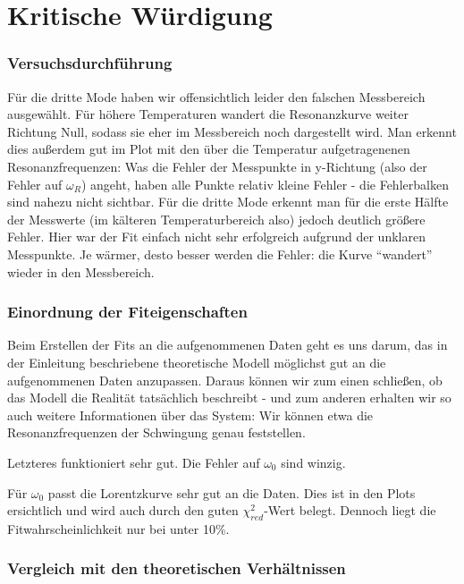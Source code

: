 \section{Kritische Würdigung}

\subsubsection*{Versuchsdurchführung}


Für die dritte Mode haben wir offensichtlich leider den falschen Messbereich ausgewählt.
Für höhere Temperaturen wandert die Resonanzkurve weiter Richtung Null, sodass sie eher im Messbereich noch dargestellt wird.
Man erkennt dies außerdem gut im Plot mit den über die Temperatur aufgetragenenen Resonanzfrequenzen:
Was die Fehler der Messpunkte in y-Richtung (also der Fehler auf $\omega_R$) angeht, haben alle Punkte relativ kleine Fehler - die Fehlerbalken sind nahezu nicht sichtbar.
Für die dritte Mode erkennt man für die erste Hälfte der Messwerte (im kälteren Temperaturbereich also) jedoch deutlich größere Fehler.
Hier war der Fit einfach nicht sehr erfolgreich aufgrund der unklaren Messpunkte.
Je wärmer, desto besser werden die Fehler: die Kurve \enquote{wandert} wieder in den Messbereich.

\subsubsection*{Einordnung der Fiteigenschaften}


Beim Erstellen der Fits an die aufgenommenen Daten geht es uns darum, das in der Einleitung beschriebene theoretische Modell möglichst gut an die aufgenommenen Daten anzupassen.
Daraus können wir zum einen schließen, ob das Modell die Realität tatsächlich beschreibt - und zum anderen erhalten wir so auch weitere Informationen über das System:
Wir können etwa die Resonanzfrequenzen der Schwingung genau feststellen.

Letzteres funktioniert sehr gut.
Die Fehler auf $\omega_0$ sind winzig.

Für $\omega_{0}$ passt die Lorentzkurve sehr gut an die Daten.
Dies ist in den Plots ersichtlich und wird auch durch den guten $\chi_{red}^2$-Wert belegt.
Dennoch liegt die Fitwahrscheinlichkeit nur bei unter 10\%.

\subsubsection*{Vergleich mit den theoretischen Verhältnissen}

